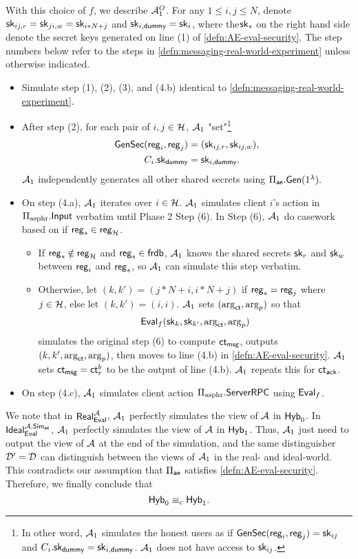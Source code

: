 With this choice of $f$, we describe $\mathcal{A}_1^O$. For any $1 \leq i, j \leq N$, denote ${\mathsf{sk}}_{ij, r} = {\mathsf{sk}}_{ji, w} = {\mathsf{sk}}_{i * N + j}$ and ${\mathsf{sk}}_{i, \mathsf{dummy}} = {\mathsf{sk}}_i$, where the${\mathsf{sk}}_{*}$ on the right hand side denote the secret keys generated on line (1) of \cref{defn:AE-eval-security}. The step numbers below refer to the steps in \cref{defn:messaging-real-world-experiment} unless otherwise indicated. 
\begin{itemize}
    \item Simulate step (1), (2), (3), and (4.b) identical to \cref{defn:messaging-real-world-experiment}.
    \item After step (2), for each pair of $i, j \in \mathcal{H}$, $\mathcal{A}_1$ "set"\footnote{In other word, $\mathcal{A}_1$ simulates the honest users as if $\mathsf{GenSec}(\mathsf{reg}_i, \mathsf{reg}_j) = {\mathsf{sk}}_{ij}$ and $C_i.{\mathsf{sk}}_{\mathsf{dummy}} = {\mathsf{sk}}_{i, \mathsf{dummy}}$. $\mathcal{A}_1$ does not have access to ${\mathsf{sk}}_{ij}$.} 
    \begin{align*}
    \mathsf{GenSec}(\mathsf{reg}_i, \mathsf{reg}_j) &= ({\mathsf{sk}}_{ij, r}, {\mathsf{sk}}_{ij, w}), \\
    C_i.{\mathsf{sk}}_{\mathsf{dummy}} &= {\mathsf{sk}}_{i, \mathsf{dummy}}.   
    \end{align*}
    $\mathcal{A}_1$ independently generates all other shared secrets using $\Pi_{\mathsf{ae}}.\mathsf{Gen}(1^{\lambda}).$
    \item On step (4.a), $\mathcal{A}_1$ iterates over $i \in \mathcal{H}$. $\mathcal{A}_1$ simulates client $i$'s action in $\Pi_{\text{asphr}}.\mathsf{Input}$ verbatim until Phase 2 Step (6). In Step (6), $\mathcal{A}_1$ do casework based on if $\mathsf{reg}_s \in \mathsf{reg}_{\mathcal{H}}$. 
    \begin{itemize}
        \item  If $\mathsf{reg}_s \notin \mathsf{reg}_{\mathcal{H}}$ and $\mathsf{reg}_s \in \mathsf{frdb}$, $\mathcal{A}_1$ knows the shared secrets ${\mathsf{sk}}_r$ and ${\mathsf{sk}}_w$ between $\mathsf{reg}_i$ and $\mathsf{reg}_s$, so $\mathcal{A}_1$ can simulate this step verbatim.
        \item  Otherwise, let $(k, k') = (j * N + i, i * N + j)$ if $\mathsf{reg}_s = \mathsf{reg}_j$ where $j \in \mathcal{H}$, else let $(k, k') = (i, i)$. $\mathcal{A}_1$ sets $(\arg_{\mathsf{ct}}, \arg_p)$ so that 
        $$\mathsf{Eval}_f({\mathsf{sk}}_k, {\mathsf{sk}}_{k'}, \arg_{\mathsf{ct}}, \arg_p)$$ 
        simulates the original step (6) to compute $\mathsf{ct}_{\mathsf{msg}}$, outputs $(k, k', \arg_{\mathsf{ct}}, \arg_p)$, then moves to line (4.b) in \cref{defn:AE-eval-security}. $\mathcal{A}_1$ sets $\mathsf{ct}_{\mathsf{msg}} = \mathsf{ct}^b_r$ to be the output of line (4.b). $\mathcal{A}_1$ repeats this for $\mathsf{ct}_{\mathsf{ack}}$.
    \end{itemize}
   
    \item On step (4.c), $\mathcal{A}_1$ simulates client action $\Pi_{\text{asphr}}.\mathsf{ServerRPC}$ using $\mathsf{Eval}_f$.
\end{itemize}
We note that in $\mathsf{Real}_{\mathsf{Eval}}^{\mathcal{A}}$, $\mathcal{A}_1$ perfectly simulates the view of $\mathcal{A}$ in $\mathsf{Hyb}_0$. In $\mathsf{Ideal}_{\mathsf{Eval}}^{\mathcal{A}, \mathsf{Sim}_{\mathsf{ae}}}$, $\mathcal{A}_1$ perfectly simulates the view of $\mathcal{A}$ in $\mathsf{Hyb}_1$. Thus, $\mathcal{A}_1$ just need to output the view of $\mathcal{A}$ at the end of the simulation, and the same distinguisher $\mathcal{D}' = \mathcal{D}$ can distinguish between the views of $\mathcal{A}_1$ in the real- and ideal-world. This contradicts our assumption that $\Pi_{\mathsf{ae}}$ satisfies \cref{defn:AE-eval-security}. Therefore, we finally conclude that
$$\mathsf{Hyb}_0 \equiv_c \mathsf{Hyb}_1.$$

